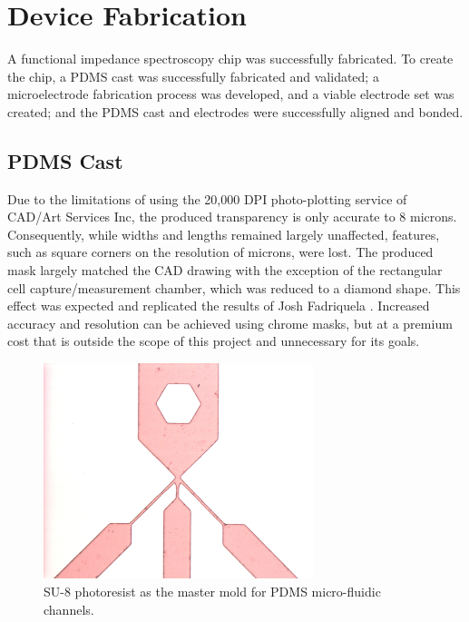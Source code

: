 
\section{Device Fabrication}

\par A functional impedance spectroscopy chip was successfully fabricated. To create the chip, a PDMS cast was successfully fabricated and validated; a microelectrode fabrication process was developed, and a viable electrode set was created; and the PDMS cast and electrodes were successfully aligned and bonded.

\subsection{PDMS Cast}
\label{sec:PDMS_cast_fabrication}

\par Due to the limitations of using the 20,000 DPI photo-plotting service of CAD/Art Services Inc, the produced transparency is only accurate to 8 microns. Consequently, while widths and lengths remained largely unaffected, features, such as square corners on the resolution of microns, were lost. The produced mask largely matched the CAD drawing with the exception of the rectangular cell capture/measurement chamber, which was reduced to a diamond shape. This effect was expected and replicated the results of Josh Fadriquela \cite{fadriquela_design_2009-1}. Increased accuracy and resolution can be achieved using chrome masks, but at a premium cost that is outside the scope of this project and unnecessary for its goals. 

\begin{figure}[H]
    \centering
    \includegraphics[width=0.7\textwidth]{images/su8_results.png}
    \caption{SU-8 photoresist as the master mold for PDMS micro-fluidic channels.}
    \label{fig:su8_results}
\end{figure}

